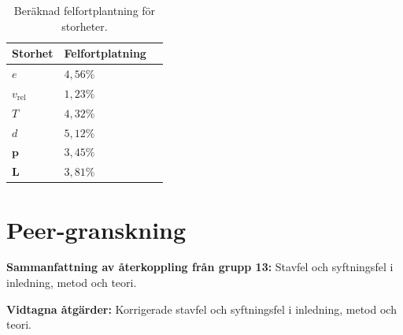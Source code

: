 \begin{table}[H]
\centering
\caption{Beräknad felfortplantning för storheter.}
\label{tab:felfort}
\begin{tabular}{@{}lll@{}}
\toprule
Storhet    & Felfortplatning                             \\ \midrule
$e$             &  $4,56\%$                                     \\
$v_{\text{rel}}$       &  $1,23\%$                                     \\
$T$             &  $4,32\%$                                     \\
$d$             &  $5,12\%$                                     \\
$\mathbf{p}$    &  $3,45\%$                                     \\
$\mathbf{L}$    &  $3,81\%$                                     \\ \bottomrule
                                                
\end{tabular}
\end{table}

\section{Peer-granskning}
\textbf{Sammanfattning av återkoppling från grupp 13: } Stavfel och syftningsfel i inledning, metod och teori. 

\textbf{Vidtagna åtgärder: } Korrigerade stavfel och syftningsfel i inledning, metod och teori.